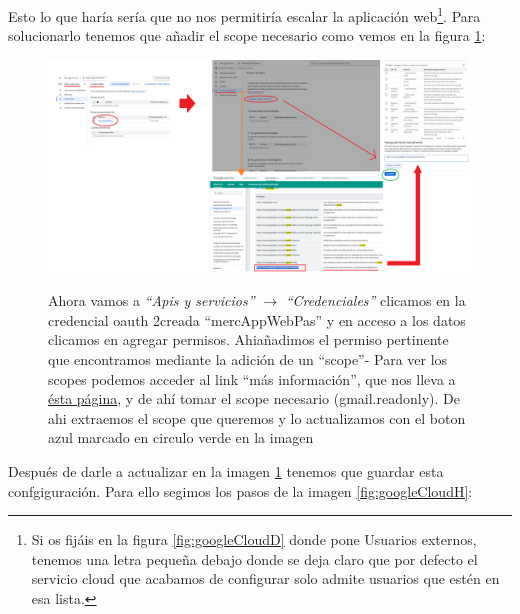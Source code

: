 \documentclass[a4paper,12pt]{report}
\begin{document}
		Esto lo que haría sería que no nos permitiría escalar la aplicación web\footnote{Si os fijáis en la figura \ref{fig:googleCloudD} donde pone Usuarios externos, tenemos una letra pequeña debajo donde se deja claro que por defecto el servicio cloud que acabamos de configurar solo admite usuarios que estén en esa lista.}. Para solucionarlo tenemos que añadir el scope necesario como vemos en la figura \ref{fig:googleCloudG}:
		
		\FloatBarrier
		\setlength{\belowcaptionskip}{3pt}
		\begin{figure}[H]
			\centering
			\caption{Ahora vamos a \textit{``Apis y servicios''} $\rightarrow$ \textit{``Credenciales''} clicamos en la credencial oauth 2creada ``mercAppWebPas'' y en acceso a los datos clicamos en agregar permisos. Ahiañadimos el permiso pertinente que encontramos mediante la adición de un ``scope''- Para ver los scopes podemos acceder al link ``más información'', que nos lleva a \href{https://developers.google.com/identity/protocols/oauth2/scopes?hl=es_419}{ésta página}, y de ahí tomar el scope necesario (gmail.readonly). De ahi extraemos el scope que queremos y lo actualizamos con el boton azul marcado en circulo verde en la imagen}
			\includegraphics[width=1\linewidth]{img/googleCloudG}
			\label{fig:googleCloudG}
		\end{figure}
		\FloatBarrier
		
		Después de darle a actualizar en la imagen \ref{fig:googleCloudG} tenemos que guardar esta confgiguración. Para ello segimos los pasos de la imagen \ref{fig:googleCloudH}:
		
\end{document}
